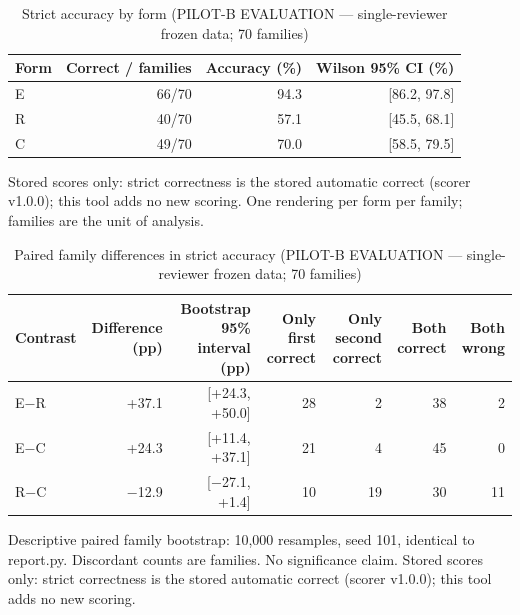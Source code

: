 \begin{table}[t]
\centering
\small
\caption{Strict accuracy by form (PILOT-B EVALUATION --- single-reviewer frozen data; 70 families)}
\label{tab:pilotb-Llama-3.2-3B-Instruct-accuracy}
\begin{tabular}{lrrr}
\toprule
Form & Correct / families & Accuracy (\%) & Wilson 95\% CI (\%) \\
\midrule
E & 66/70 & 94.3 & [86.2, 97.8] \\
R & 40/70 & 57.1 & [45.5, 68.1] \\
C & 49/70 & 70.0 & [58.5, 79.5] \\
\bottomrule
\end{tabular}
\par\smallskip
\parbox{\linewidth}{\footnotesize Stored scores only: strict correctness is the stored automatic correct (scorer v1.0.0); this tool adds no new scoring. One rendering per form per family; families are the unit of analysis.}
\end{table}

\begin{table}[t]
\centering
\small
\caption{Paired family differences in strict accuracy (PILOT-B EVALUATION --- single-reviewer frozen data; 70 families)}
\label{tab:pilotb-Llama-3.2-3B-Instruct-paired}
\begin{tabular}{lrrrrrr}
\toprule
Contrast & Difference (pp) & Bootstrap 95\% interval (pp) & Only first correct & Only second correct & Both correct & Both wrong \\
\midrule
E$-$R & +37.1 & [+24.3, +50.0] & 28 & 2 & 38 & 2 \\
E$-$C & +24.3 & [+11.4, +37.1] & 21 & 4 & 45 & 0 \\
R$-$C & $-$12.9 & [$-$27.1, +1.4] & 10 & 19 & 30 & 11 \\
\bottomrule
\end{tabular}
\par\smallskip
\parbox{\linewidth}{\footnotesize Descriptive paired family bootstrap: 10,000 resamples, seed 101, identical to report.py. Discordant counts are families. No significance claim. Stored scores only: strict correctness is the stored automatic correct (scorer v1.0.0); this tool adds no new scoring.}
\end{table}

